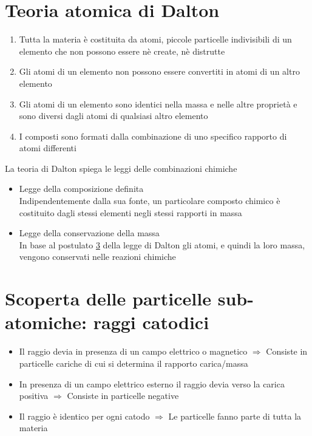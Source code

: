 \documentclass[a4paper,11pt]{report}
\begin{document}
\section{Teoria atomica di Dalton}
\begin{enumerate}
	\item Tutta la materia è costituita da atomi, piccole particelle indivisibili di un elemento che non possono essere nè create, nè distrutte
	\item Gli atomi di un elemento non possono essere convertiti in atomi di un altro elemento
	\item Gli atomi di un elemento sono identici nella massa e nelle altre proprietà e sono diversi dagli atomi di qualsiasi altro elemento \label{3}
	\item I composti sono formati dalla combinazione di uno specifico rapporto di atomi differenti
\end{enumerate}
\noindent La teoria di Dalton spiega le leggi delle combinazioni chimiche
\begin{itemize}
	\item Legge della composizione definita \hfil\\
	Indipendentemente dalla sua fonte, un particolare composto chimico è costituito dagli stessi elementi negli stessi rapporti in massa
	\item Legge della conservazione della massa \hfill\\
	In base al postulato \hyperref[3]{3} della legge di Dalton gli atomi, e quindi la loro massa, vengono conservati nelle reazioni chimiche
\end{itemize}
\section*{Scoperta delle particelle sub-atomiche: raggi catodici}
\begin{itemize}
	\item Il raggio devia in presenza di un campo elettrico o magnetico $\Rightarrow$ Consiste in particelle cariche di cui si determina il rapporto carica/massa
	\item In presenza di un campo elettrico esterno il raggio devia verso la carica positiva $\Rightarrow$ Consiste in particelle negative
	\item Il raggio è identico per ogni catodo $\Rightarrow$ Le particelle fanno parte di tutta la materia
\end{itemize}
\end{document}
